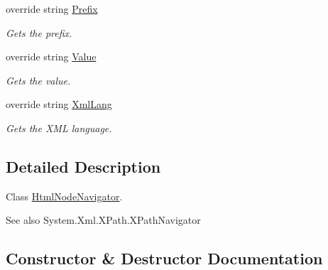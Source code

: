 \begin{DoxyCompactItemize}
override string \hyperlink{class_html_agility_pack_1_1_html_node_navigator_abe6c60a34381774d1a3301e6f55f7c72}{Prefix}
\begin{DoxyCompactList}\small\item\em Gets the prefix. \end{DoxyCompactList}\item 
override string \hyperlink{class_html_agility_pack_1_1_html_node_navigator_a9e085909421b188bdc28f6f34ce2072e}{Value}
\begin{DoxyCompactList}\small\item\em Gets the value. \end{DoxyCompactList}\item 
override string \hyperlink{class_html_agility_pack_1_1_html_node_navigator_ad6be697bf6a02cb6b44aa4d1b5611ebe}{Xml\+Lang}
\begin{DoxyCompactList}\small\item\em Gets the X\+ML language. \end{DoxyCompactList}\end{DoxyCompactItemize}


\subsection{Detailed Description}
Class \hyperlink{class_html_agility_pack_1_1_html_node_navigator}{Html\+Node\+Navigator}. 

\begin{DoxySeeAlso}{See also}
System.\+Xml.\+X\+Path.\+X\+Path\+Navigator


\end{DoxySeeAlso}


\subsection{Constructor \& Destructor Documentation}
\mbox{\label{class_html_agility_pack_1_1_html_node_navigator_aecbd88a04f3d05a10f6a489098973ab6}} 
